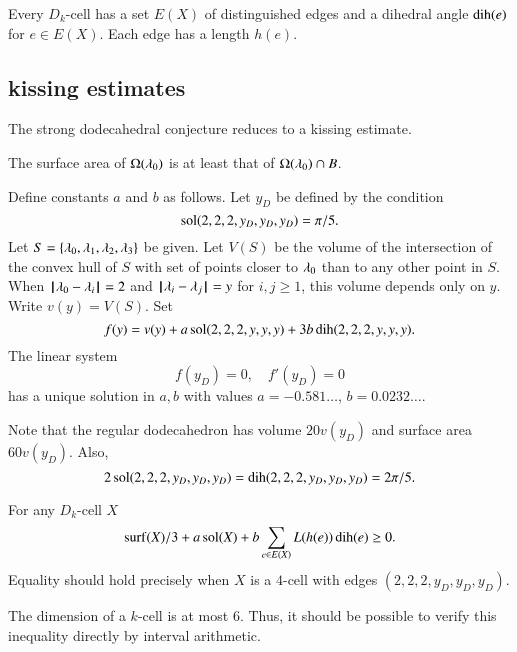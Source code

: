 Every $D_k$-cell has a set $E(X)$ of distinguished edges and a dihedral angle $\operatorname{dih}(e)$ for $e\in E(X)$.  Each edge has a length $h(e)$.

\subsection{kissing estimates}

The strong dodecahedral conjecture reduces to a kissing estimate.

\begin{lemma} The surface area of $\Omega(\lambda_0)$ is at least that
of $\Omega(\lambda_0)\cap B$.
\end{lemma}

\begin{definition}
Define constants $a$ and $b$ as follows.  Let $y_D$ be defined
by the condition
$$
\operatorname{sol}(2,2,2,y_D,y_D,y_D) = \pi/5.
$$
Let $S=\{\lambda_0,\lambda_1,\lambda_2,\lambda_3\}$ be given.  Let $V(S)$ be the
volume of the intersection of the convex hull of $S$ with set of points closer to $\lambda_0$ than to any other point in $S$.  When ${\hskip0.1em|\hskip-0.15em|\hskip0.1em}\lambda_0 - \lambda_i{\hskip0.1em|\hskip-0.15em|\hskip0.1em} = 2$ and ${\hskip0.1em|\hskip-0.15em|\hskip0.1em}\lambda_i - \lambda_j{\hskip0.1em|\hskip-0.15em|\hskip0.1em} = y$ for $i,j\ge 1$, this volume depends
only on $y$. Write $v(y) = V(S)$.  Set
$$
f(y) = v(y) + a \operatorname{sol}(2,2,2,y,y,y) + 3 b \operatorname{dih}(2,2,2,y,y,y).
$$
The linear system
$$
f(y_D) = 0,\quad f'(y_D) = 0
$$
has a unique solution in $a,b$ with values $a=-0.581\ldots$, $b=0.0232\ldots$.
\end{definition}

Note that the regular dodecahedron has volume $20 v(y_D)$ and surface area $60 v(y_D)$.  Also,
$$
2\operatorname{sol}(2,2,2,y_D,y_D,y_D) =\operatorname{dih}(2,2,2,y_D,y_D,y_D)=2\pi/5.
$$

\begin{conjecture}  For any $D_k$-cell $X$
$$
{\operatorname{surf}}(X)/3 + a \operatorname{sol}(X) + b \sum_{e\in E(X)} L(h(e)) \operatorname{dih}(e) \ge 0.
$$
Equality should hold precisely when $X$ is a $4$-cell with edges
$(2,2,2,y_D,y_D,y_D)$.
\end{conjecture}

\begin{note} %
The dimension of a $k$-cell is at most $6$.  Thus, it should be possible to verify this inequality directly by interval arithmetic.
\end{note}


